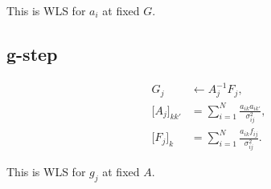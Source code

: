 \documentclass{article}
\begin{document}
This is WLS for $a_i$ at fixed $G$.

\subsection*{g-step}

\begin{align*}
G_j &\leftarrow A_j^{-1} F_j, \\
\big[A_j\big]_{kk'} &= \sum_{i=1}^N \frac{a_{ik} a_{ik'}}{\sigma_{ij}^2}, \\
\big[F_j\big]_k &= \sum_{i=1}^N \frac{a_{ik} f_{ij}}{\sigma_{ij}^2}.
\end{align*}

This is WLS for $g_j$ at fixed $A$.
\end{document}
